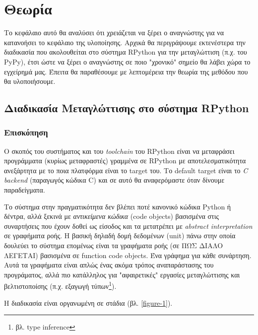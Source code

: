 
\chapter{Θεωρία}
\label{chapter3} 

Το κεφάλαιο αυτό θα αναλύσει ότι χρειάζεται να ξέρει ο αναγνώστης για να
κατανοήσει το κεφάλαιο της υλοποίησης. Αρχικά θα περιγράψουμε εκτενέστερα την
διαδικασία που ακολουθείται στο σύστημα RPython για την μεταγλώττιση (π.χ. του
PyPy), έτσι ώστε να ξέρει ο αναγνώστης σε ποιο "χρονικό" σημείο θα λάβει χώρα το
εγχείρημά μας. Έπειτα θα παραθέσουμε με λεπτομέρεια την θεωρία της μεθόδου που
θα υλοποιήσουμε.


\section{Διαδικασία Μεταγλώττισης στο σύστημα RPython}

\subsection{Επισκόπηση}

Ο σκοπός του συστήματος και του \textit{toolchain} του RPython είναι να
μεταφράσει προγράμματα (κυρίως μεταφραστές) γραμμένα σε RPython με
αποτελεσματικότητα ανεξάρτητα με το ποια πλατφόρμα είναι το target του. Το
default target είναι το \textit{C backend} (παραγωγός κώδικα C) και σε αυτό θα
αναφερόμαστε όταν δίνουμε παραδείγματα.

Το σύστημα στην πραγματικότητα δεν βλέπει ποτέ κανονικό κώδικα Python ή δέντρα,
αλλά ξεκινά με \textit{αντικείμενα κώδικα} (code objects) βασισμένα στις
συναρτήσεις που έχουν δοθεί ως είσοδος και τα μετατρέπει με \textit{abstract
interpretation}\cite{CousotCousot77}\cite{debray1995abstract} σε γραφήματα ροής.
Η βασική δηλαδή δομή δεδομένων (unit) πάνω στην οποία δουλεύει το σύστημα
επομένως είναι τα γραφήματα ροής (σε ΠΩΣ ΔΙΑΛΟ ΛΕΓΕΤΑΙ) βασισμένα σε function
code objects. Ένα γράφημα για κάθε συνάρτηση. Αυτά τα γραφήματα είναι απλώς ένας
ακόμα τρόπος αναπαράστασης του προγράματος, αλλά πιο κατάλληλος για
"αφαιρετικές" εργασίες μεταγλώττισης και βελτιστοποίσης (π.χ. εξαγωγή
τύπων\footnote{βλ. type inference}).

Η διαδικασία είναι οργανωμένη σε στάδια (βλ. \ref{figure-1}).

